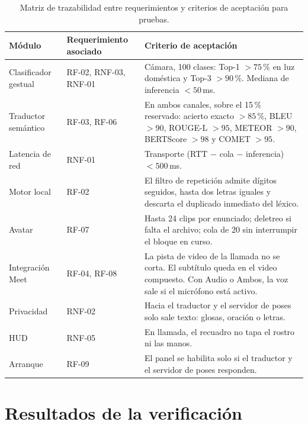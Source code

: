 \begin{table}[H]
    \centering
    \small
    \caption{Matriz de trazabilidad entre requerimientos y criterios de aceptación para pruebas.}
    \label{tab:trazabilidad_pruebas}
    \begin{tabularx}{\textwidth}{>{\raggedright\arraybackslash}p{2.7cm} >{\raggedright\arraybackslash}p{3.1cm} >{\raggedright\arraybackslash}X}
        \toprule
        \textbf{Módulo} & \textbf{Requerimiento asociado} & \textbf{Criterio de aceptación} \\
        \midrule
         Clasificador gestual & RF-02, RNF-03, RNF-01 & Cámara, 100 clases: Top-1 $> 75$\,\% en luz doméstica y Top-3 $> 90$\,\%. Mediana de inferencia $< 50$\,ms. \\
        Traductor semántico & RF-03, RF-06 & En ambos canales, sobre el 15\,\% reservado: acierto exacto $> 85$\,\%, BLEU $> 90$, ROUGE-L $> 95$, METEOR $> 90$, BERTScore $> 98$ y COMET $> 95$. \\
        Latencia de red & RNF-01 & Transporte (RTT $-$ cola $-$ inferencia) $< 500$\,ms. \\
        Motor local & RF-02 & El filtro de repetición admite dígitos seguidos, hasta dos letras iguales y descarta el duplicado inmediato del léxico. \\
        Avatar & RF-07 & Hasta 24 clips por enunciado; deletreo si falta el archivo; cola de 20 sin interrumpir el bloque en curso. \\
        Integración Meet & RF-04, RF-08 & La pista de video de la llamada no se corta. El subtítulo queda en el video compuesto. Con Audio o Ambos, la voz sale si el micrófono está activo. \\
        Privacidad & RNF-02 & Hacia el traductor y el servidor de poses solo sale texto: glosas, oración o letras. \\
        HUD & RNF-05 & En llamada, el recuadro no tapa el rostro ni las manos. \\
        Arranque & RF-09 & El panel se habilita solo si el traductor y el servidor de poses responden. \\
        \bottomrule
    \end{tabularx}
\end{table}

\section{Resultados de la verificación}
\label{sec:resultados_verificacion}

